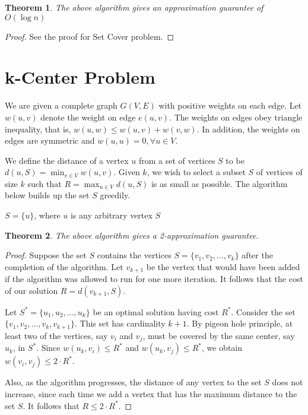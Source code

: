 \documentclass[10pt]{article}
\newtheorem{theorem}{Theorem}[section]
\begin{document}
\begin{theorem}
The above algorithm gives an approximation guarantee of $O(\log{n})$
\end{theorem}
\begin{proof}
See the proof for Set Cover problem.
\end{proof}


\section{k-Center Problem}
We are given a complete graph $G(V,E)$ with positive weights on each edge. Let $w(u,v)$ denote the weight on edge $e(u,v)$. The weights on edges obey triangle inequality, that is, $w(u,w) \leq w(u,v) + w(v,w)$. In addition, the weights on edges are symmetric and $w(u,u) = 0,  \forall u \in V$.

We define the distance of a vertex $u$ from a set of vertices $S$ to be $d(u,S) = \min_{v \in V} w(u,v)$. Given $k$, we wish to select a subset $S$ of vertices of size $k$ such that $R = \max_{u \in V}d(u, S)$ is as small as possible. The algorithm below builds up the set $S$ greedily.

\begin{algorithm}[H]
\dontprintsemicolon
$S = \{u\}$, where $u$ is any arbitrary vertex \;
\Return $S$
\end{algorithm}

\begin{theorem}
The above algorithm gives a 2-approximation guarantee.
\end{theorem}
\begin{proof}
Suppose the set $S$ contains the vertices $S = \{v_1, v_2, \ldots , v_k\}$ after the completion of the algorithm. Let $v_{k+1}$ be the vertex that would have been added if the algorithm was allowed to run for one more iteration. It follows that the cost of our solution $R = d(v_{k+1}, S)$.

Let $S^* = \{u_1, u_2, \ldots ,u_k\}$ be an optimal solution having cost $R^*$. Consider the set $\{v_1, v_2, \ldots , v_k, v_{k+1}\}$. This set has cardinality $k+1$. By pigeon hole principle, at least two of the vertices, say $v_i$ and $v_j$, must be covered by the same center, say $u_k$, in $S^*$. Since $w(u_k,v_i) \leq R^*$ and $w(u_k,v_j) \leq R^*$, we obtain $w(v_i,v_j) \leq 2 \cdot R^*$.

Also, as the algorithm progresses, the distance of any vertex to the set $S$ does not increase, since each time we add a vertex that has the maximum distance to the set $S$. It follows that $R \leq 2 \cdot R^*$.
\end{proof}
\end{document}
